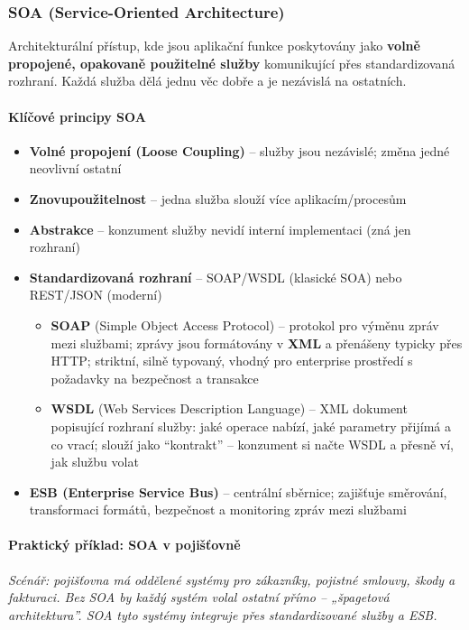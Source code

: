 \subsubsection{SOA (Service-Oriented Architecture)}

Architekturální přístup, kde jsou aplikační funkce poskytovány jako \textbf{volně propojené,
opakovaně použitelné služby} komunikující přes standardizovaná rozhraní. Každá služba dělá
jednu věc dobře a je nezávislá na ostatních.

\paragraph{Klíčové principy SOA}
\begin{itemize}
  \item \textbf{Volné propojení (Loose Coupling)} -- služby jsou nezávislé; změna jedné neovlivní ostatní
  \item \textbf{Znovupoužitelnost} -- jedna služba slouží více aplikacím/procesům
  \item \textbf{Abstrakce} -- konzument služby nevidí interní implementaci (zná jen rozhraní)
  \item \textbf{Standardizovaná rozhraní} -- SOAP/WSDL (klasické SOA) nebo REST/JSON (moderní)
    \begin{itemize}
      \item \textbf{SOAP} (Simple Object Access Protocol) -- protokol pro výměnu zpráv mezi službami;
        zprávy jsou formátovány v \textbf{XML} a přenášeny typicky přes HTTP;
        striktní, silně typovaný, vhodný pro enterprise prostředí s požadavky na bezpečnost a transakce
      \item \textbf{WSDL} (Web Services Description Language) -- XML dokument popisující rozhraní služby:
        jaké operace nabízí, jaké parametry přijímá a co vrací;
        slouží jako ``kontrakt'' -- konzument si načte WSDL a přesně ví, jak službu volat
    \end{itemize}
  \item \textbf{ESB (Enterprise Service Bus)} -- centrální sběrnice; zajišťuje směrování, transformaci
    formátů, bezpečnost a monitoring zpráv mezi službami
\end{itemize}

\paragraph{Praktický příklad: SOA v pojišťovně}

\textit{Scénář: pojišťovna má oddělené systémy pro zákazníky, pojistné smlouvy, škody a fakturaci.
Bez SOA by každý systém volal ostatní přímo -- „špagetová architektura''. SOA tyto systémy integruje
přes standardizované služby a ESB.}

